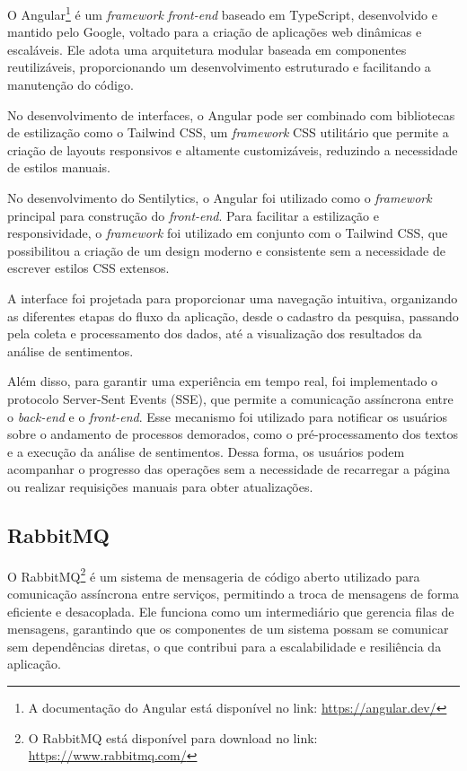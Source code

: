 \documentclass[
	12pt,				%
	oneside,			%
	a4paper,			%
	english,			%
	french,				%
	spanish,			%
	brazil				%
	]{abntex2}
\begin{document}
O Angular\footnote{A documentação do Angular está disponível no link:
  \url{https://angular.dev/}} é um \emph{framework} \emph{front-end}
baseado em TypeScript, desenvolvido e mantido pelo Google, voltado para
a criação de aplicações web dinâmicas e escaláveis. Ele adota uma
arquitetura modular baseada em componentes reutilizáveis, proporcionando
um desenvolvimento estruturado e facilitando a manutenção do código.

No desenvolvimento de interfaces, o Angular pode ser combinado com
bibliotecas de estilização como o Tailwind CSS, um \emph{framework} CSS
utilitário que permite a criação de layouts responsivos e altamente
customizáveis, reduzindo a necessidade de estilos manuais.

No desenvolvimento do Sentilytics, o Angular foi utilizado como o
\emph{framework} principal para construção do \emph{front-end}. Para
facilitar a estilização e responsividade, o \emph{framework} foi
utilizado em conjunto com o Tailwind CSS, que possibilitou a criação de
um design moderno e consistente sem a necessidade de escrever estilos
CSS extensos.

A interface foi projetada para proporcionar uma navegação intuitiva,
organizando as diferentes etapas do fluxo da aplicação, desde o cadastro
da pesquisa, passando pela coleta e processamento dos dados, até a
visualização dos resultados da análise de sentimentos.

Além disso, para garantir uma experiência em tempo real, foi
implementado o protocolo Server-Sent Events (SSE), que permite a
comunicação assíncrona entre o \emph{back-end} e o \emph{front-end}.
Esse mecanismo foi utilizado para notificar os usuários sobre o
andamento de processos demorados, como o pré-processamento dos textos e
a execução da análise de sentimentos. Dessa forma, os usuários podem
acompanhar o progresso das operações sem a necessidade de recarregar a
página ou realizar requisições manuais para obter atualizações.

\hypertarget{rabbitmq}{%
\subsection{RabbitMQ}\label{rabbitmq}}

O RabbitMQ\footnote{O RabbitMQ está disponível para download no link:
  \url{https://www.rabbitmq.com/}} é um sistema de mensageria de código
aberto utilizado para comunicação assíncrona entre serviços, permitindo
a troca de mensagens de forma eficiente e desacoplada. Ele funciona como
um intermediário que gerencia filas de mensagens, garantindo que os
componentes de um sistema possam se comunicar sem dependências diretas,
o que contribui para a escalabilidade e resiliência da aplicação.
\end{document}
